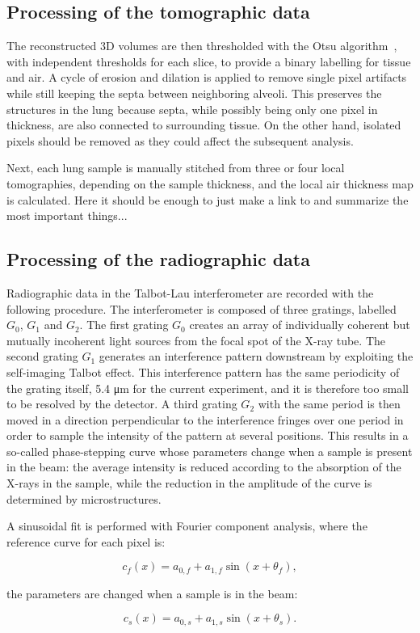 
\subsection{Processing of the tomographic data}\label{sec:tomoprocessing}
The reconstructed 3D volumes are then thresholded with the Otsu algorithm~\cite{Otsu_1979}, with independent thresholds
for each slice, to provide a binary labelling for tissue and air. A cycle of
erosion and dilation is applied to remove single pixel artifacts while still
keeping the septa between neighboring alveoli. This preserves the structures
in the lung because septa, while possibly being only one pixel in thickness,
are also connected to surrounding tissue. On the other hand, isolated pixels
should be removed as they could affect the subsequent analysis.

Next, each lung sample is manually stitched from three or four local
tomographies, depending on the sample thickness, and the local air thickness
map is calculated. Here it should be enough to just make a link to \cite{Lovric2017} and summarize the most important things...

\subsection{Processing of the radiographic data}\label{sec:radioprocessing}
Radiographic data in the Talbot-Lau interferometer are recorded with the
following procedure. The interferometer is composed of three gratings,
labelled $G_0$, $G_1$ and $G_2$. The first grating $G_0$ creates an array of
individually coherent but mutually incoherent light sources from the
focal spot of the X-ray tube. The second grating $G_1$ generates an
interference pattern downstream by exploiting the self-imaging Talbot
effect. This interference pattern has the same periodicity of the grating
itself, 5.4 μm for the current experiment, and it is therefore too small to
be resolved by the detector. A third grating $G_2$ with the same period is
then moved in a direction perpendicular to the interference fringes over one
period in order to sample the intensity of the pattern at several positions.
This results in a so-called phase-stepping curve whose parameters change
when a sample is present in the beam: the average intensity is reduced
according to the absorption of the X-rays in the sample, while the reduction
in the amplitude of the curve is determined by microstructures.

A sinusoidal fit is performed with Fourier component analysis, where the
reference curve for each pixel is:

\begin{equation}
    c_f(x) = a_{0,f} + a_{1,f} \sin(x + \theta_{f}),
    \label{eqn:flat}
\end{equation}

the parameters are changed when a sample is in the beam:

\begin{equation}
    c_s(x) = a_{0,s} + a_{1,s} \sin(x + \theta_{s}).
    \label{eqn:sample}
\end{equation}